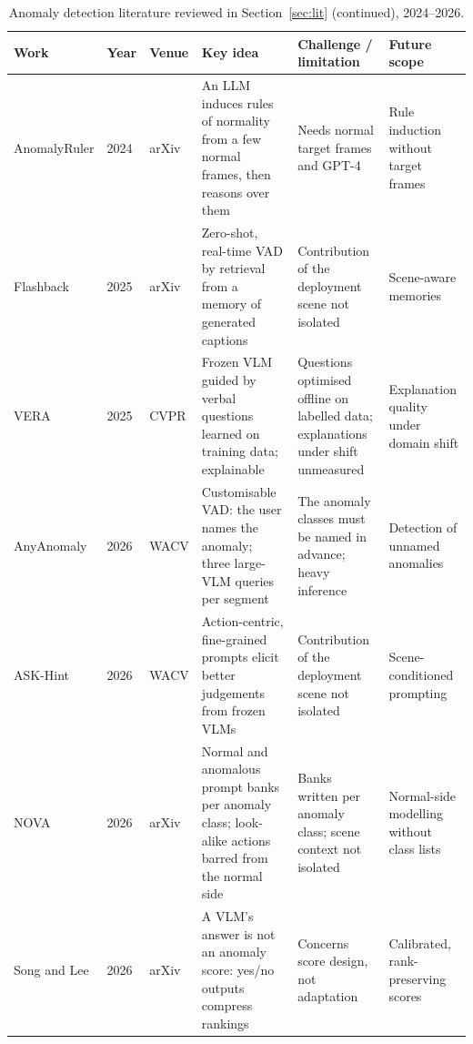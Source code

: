 \documentclass[a4paper,fleqn]{cas-sc}
\begin{document}
\begin{table}[width=\linewidth,cols=6,pos=htbp]
\caption{Anomaly detection literature reviewed in Section~\ref{sec:lit}
(continued), 2024--2026.}
\label{tbl:lit-vad2}
\footnotesize
\begin{tabularx}{\linewidth}{@{}W{2.1cm} l W{1.2cm} Z Z Z@{}}
\toprule
\textbf{Work} & \textbf{Year} & \textbf{Venue} & \textbf{Key idea} &
\textbf{Challenge / limitation} & \textbf{Future scope} \\
\midrule
AnomalyRuler \citep{yang2024anomalyruler} & 2024 & arXiv &
An LLM induces rules of normality from a few normal frames, then reasons over them &
Needs normal target frames and GPT-4 &
Rule induction without target frames \\
\addlinespace
Flashback \citep{lee2025flashback} & 2025 & arXiv &
Zero-shot, real-time VAD by retrieval from a memory of generated captions &
Contribution of the deployment scene not isolated &
Scene-aware memories \\
\addlinespace
VERA \citep{ye2025vera} & 2025 & CVPR &
Frozen VLM guided by verbal questions learned on training data; explainable &
Questions optimised offline on labelled data; explanations under shift
unmeasured &
Explanation quality under domain shift \\
\addlinespace
AnyAnomaly \citep{anyanomaly2025} & 2026 & WACV &
Customisable VAD: the user names the anomaly; three large-VLM queries per segment &
The anomaly classes must be named in advance; heavy inference &
Detection of unnamed anomalies \\
\addlinespace
ASK-Hint \citep{zou2026askhint} & 2026 & WACV &
Action-centric, fine-grained prompts elicit better judgements from frozen VLMs &
Contribution of the deployment scene not isolated &
Scene-conditioned prompting \\
\addlinespace
NOVA \citep{yin2026nova} & 2026 & arXiv &
Normal and anomalous prompt banks per anomaly class; look-alike actions barred
from the normal side &
Banks written per anomaly class; scene context not isolated &
Normal-side modelling without class lists \\
\addlinespace
Song and Lee \citep{song2026vlmanswer} & 2026 & arXiv &
A VLM's answer is not an anomaly score: yes/no outputs compress rankings &
Concerns score design, not adaptation &
Calibrated, rank-preserving scores \\
\bottomrule
\end{tabularx}
\end{table}
\end{document}
